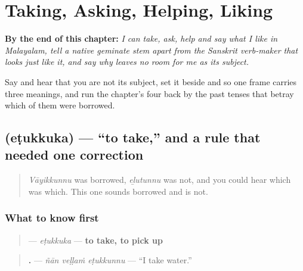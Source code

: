 
\chapter{Taking, Asking, Helping, Liking}
\label{ch:ml-taking-asking-helping-liking}

\begin{chapteropening}
\textbf{By the end of this chapter:} \emph{I can take, ask, help and say what I like in Malayalam, tell a native geminate stem apart from the Sanskrit verb-maker that looks just like it, and say why    leaves no room for me as its subject.}

Say    and hear that you are not its subject, set it beside    and   so one frame carries three meanings, and run the chapter's four back by the past tenses that betray which of them were borrowed.
\end{chapteropening}

\section[\texorpdfstring{\ml{എടുക്കുക} (eṭukkuka)}{എടുക്കുക (eṭukkuka)}]{ (eṭukkuka) — \textquotedblleft{}to take,\textquotedblright{} and a rule that needed one correction}

\label{lesson:ML-C34-edukkuka}



\begin{quote}
\emph{Vāyikkunnu} was borrowed, \emph{eḻutunnu} was not, and you could hear which was which. This one sounds borrowed and is not.
\end{quote}

\subsection*{What to know first}
\begin{quote}
\textbf{} — \emph{eṭukkuka} — \textbf{to take, to pick up}
\end{quote}

\begin{quote}
\textbf{  .} — \emph{ñān veḷḷaṁ eṭukkunnu} — \textquotedblleft{}I take water.\textquotedblright{}
\end{quote}

